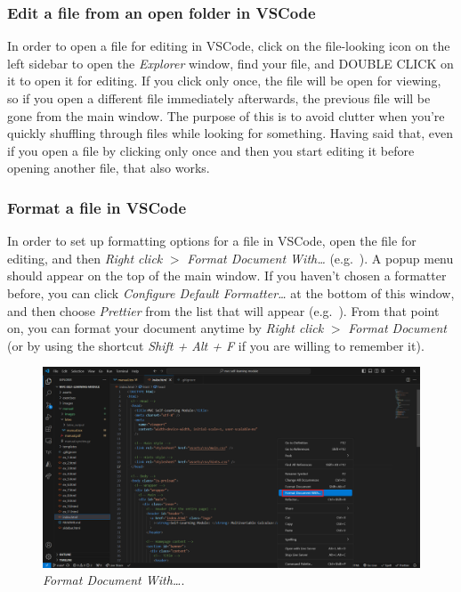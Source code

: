 \documentclass[a4paper,10pt]{article}
\begin{document}
\subsubsection{Edit a file from an open folder in VSCode}

In order to open a file for editing in VSCode, click on the file-looking icon on the left sidebar to open the \emph{Explorer} window, find your file, and DOUBLE CLICK on it to open it for editing. If you click only once, the file will be open for viewing, so if you open a different file immediately afterwards, the previous file will be gone from the main window. The purpose of this is to avoid clutter when you're quickly shuffling through files while looking for something. Having said that, even if you open a file by clicking only once and then you start editing it before opening another file, that also works.

\subsubsection{Format a file in VSCode}

In order to set up formatting options for a file in VSCode, open the file for editing, and then \emph{Right click} $>$ \emph{Format Document With\dots} (e.g.\ ). A popup menu should appear on the top of the main window. If you haven't chosen a formatter before, you can click \emph{Configure Default Formatter\dots} at the bottom of this window, and then choose \emph{Prettier} from the list that will appear (e.g.\ ). From that point on, you can format your document anytime by \emph{Right click} $>$ \emph{Format Document} (or by using the shortcut \emph{Shift + Alt + F} if you are willing to remember it).

\begin{figure}[htbp]
    \centering
    \includegraphics[width=\textwidth]{format_doc.png}
    \caption{\emph{Format Document With\dots}.}
    \label{fig:format_doc}   
\end{figure}
\end{document}
